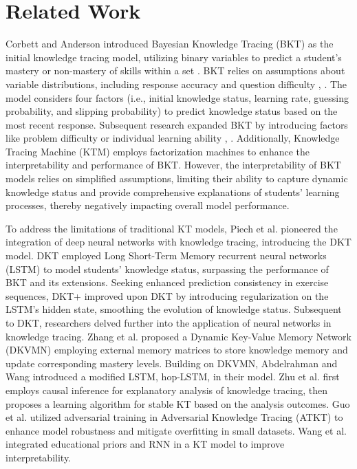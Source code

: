 \section{Related Work}
Corbett and Anderson introduced Bayesian Knowledge Tracing (BKT) as the initial knowledge tracing model, utilizing binary variables to predict a student's mastery or non-mastery of skills within a set \cite{BKT}. BKT relies on assumptions about variable distributions, including response accuracy and question difficulty \cite{BKTAssumption1}, \cite{BKTAssumption2}. The model considers four factors (i.e., initial knowledge status, learning rate, guessing probability, and slipping probability) to predict knowledge status based on the most recent response. Subsequent research expanded BKT by introducing factors like problem difficulty or individual learning ability \cite{BKTImprovement1}, \cite{BKTImprovement2}. Additionally, Knowledge Tracing Machine (KTM) \cite{KTM} employs factorization machines \cite{FactorizationMachine} to enhance the interpretability and performance of BKT. However, the interpretability of BKT models relies on simplified assumptions, limiting their ability to capture dynamic knowledge status and provide comprehensive explanations of students' learning processes, thereby negatively impacting overall model performance.

To address the limitations of traditional KT models, Piech et al. \cite{DKT} pioneered the integration of deep neural networks with knowledge tracing, introducing the DKT model. DKT employed Long Short-Term Memory recurrent neural networks (LSTM) \cite{LSTM} to model students' knowledge status, surpassing the performance of BKT and its extensions. Seeking enhanced prediction consistency in exercise sequences, DKT+ \cite{DKT+} improved upon DKT by introducing regularization on the LSTM's hidden state, smoothing the evolution of knowledge status. Subsequent to DKT, researchers delved further into the application of neural networks in knowledge tracing. Zhang et al. \cite{DKVMN} proposed a Dynamic Key-Value Memory Network (DKVMN) employing external memory matrices to store knowledge memory and update corresponding mastery levels. Building on DKVMN, Abdelrahman and Wang \cite{SKVMN} introduced a modified LSTM, hop-LSTM, in their model. Zhu et al. \cite{StableKT} first employs causal inference for explanatory analysis of knowledge tracing, then proposes a learning algorithm for stable KT based on the analysis outcomes. Guo et al. \cite{ATKT} utilized adversarial training in Adversarial Knowledge Tracing (ATKT) to enhance model robustness and mitigate overfitting in small datasets. Wang et al. \cite{DCD} integrated educational priors and RNN in a KT model to improve interpretability.

